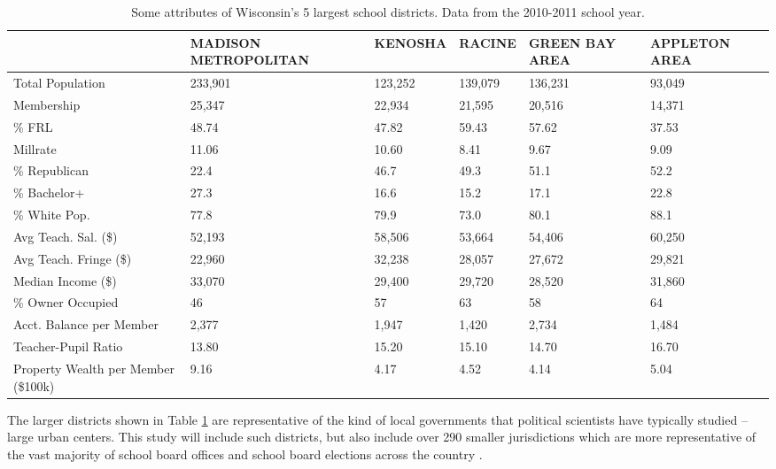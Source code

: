 \begin{table}[ht]
\centering
{\scriptsize
\begin{tabular}{p{1.25in}p{.8in}p{.8in}p{.8in}p{.8in}p{.8in}}
  \hline
 & MADISON METROPOLITAN & KENOSHA & RACINE & GREEN BAY AREA & APPLETON AREA \\ 
  \hline
Total Population & 233,901 & 123,252 & 139,079 & 136,231 & 93,049 \\ 
  Membership & 25,347 & 22,934 & 21,595 & 20,516 & 14,371 \\ 
  \% FRL & 48.74 & 47.82 & 59.43 & 57.62 & 37.53 \\ 
  Millrate & 11.06 & 10.60 & 8.41 & 9.67 & 9.09 \\ 
  \% Republican & 22.4 & 46.7 & 49.3 & 51.1 & 52.2 \\ 
  \% Bachelor+ & 27.3 & 16.6 & 15.2 & 17.1 & 22.8 \\ 
  \% White Pop. & 77.8 & 79.9 & 73.0 & 80.1 & 88.1 \\ 
  Avg Teach. Sal. (\$) & 52,193 & 58,506 & 53,664 & 54,406 & 60,250 \\ 
  Avg Teach. Fringe (\$) & 22,960 & 32,238 & 28,057 & 27,672 & 29,821 \\ 
  Median Income (\$) & 33,070 & 29,400 & 29,720 & 28,520 & 31,860 \\ 
  \% Owner Occupied & 46 & 57 & 63 & 58 & 64 \\ 
  Acct. Balance per Member & 2,377 & 1,947 & 1,420 & 2,734 & 1,484 \\ 
  Teacher-Pupil Ratio & 13.80 & 15.20 & 15.10 & 14.70 & 16.70 \\ 
  Property Wealth per Member (\$100k) & 9.16 & 4.17 & 4.52 & 4.14 & 5.04 \\ 
   \hline
\end{tabular}
}
\caption{Some attributes of Wisconsin's 5 largest school districts. Data 
             from the 2010-2011 school year.} 
\label{tab:big5}
\end{table}


The larger districts shown in Table \ref{tab:big5} are representative of the 
kind of local governments that political scientists have typically studied -- 
large urban centers. This study will include such districts, but also include over 
290 smaller jurisdictions which are more representative of the vast majority of 
school board offices and school board elections across the country 
\citep{RefWorks:321}. 




